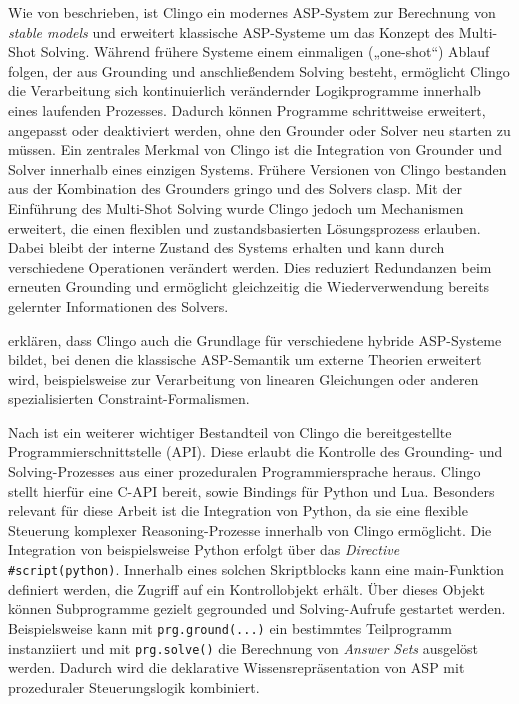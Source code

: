 Wie von \textcite{gebserMultishotASPSolving2018} beschrieben, ist Clingo ein modernes ASP-System zur Berechnung von \textit{stable models} und erweitert klassische ASP-Systeme um das Konzept des Multi-Shot Solving. Während frühere Systeme einem einmaligen („one-shot“) Ablauf folgen, der aus Grounding und anschließendem Solving besteht, ermöglicht Clingo die Verarbeitung sich kontinuierlich verändernder Logikprogramme innerhalb eines laufenden Prozesses. Dadurch können Programme schrittweise erweitert, angepasst oder deaktiviert werden, ohne den Grounder oder Solver neu starten zu müssen. Ein zentrales Merkmal von Clingo ist die Integration von Grounder und Solver innerhalb eines einzigen Systems. Frühere Versionen von Clingo bestanden aus der Kombination des Grounders gringo und des Solvers clasp. Mit der Einführung des Multi-Shot Solving wurde Clingo jedoch um Mechanismen erweitert, die einen flexiblen und zustandsbasierten Lösungsprozess erlauben. Dabei bleibt der interne Zustand des Systems erhalten und kann durch verschiedene Operationen verändert werden. Dies reduziert Redundanzen beim erneuten Grounding und ermöglicht gleichzeitig die Wiederverwendung bereits gelernter Informationen des Solvers. 

\textcite{cabalarSemanticsHybridASP2023} erklären, dass Clingo auch die Grundlage für verschiedene hybride ASP-Systeme bildet, bei denen die klassische ASP-Semantik um externe Theorien erweitert wird, beispielsweise zur Verarbeitung von linearen Gleichungen oder anderen spezialisierten Constraint-Formalismen.

Nach \textcite{gebserMultishotASPSolving2018} ist ein weiterer wichtiger Bestandteil von Clingo die bereitgestellte Programmierschnittstelle (API). Diese erlaubt die Kontrolle des Grounding- und Solving-Prozesses aus einer prozeduralen Programmiersprache heraus. Clingo stellt hierfür eine C-API bereit, sowie Bindings für Python und Lua. Besonders relevant für diese Arbeit ist die Integration von Python, da sie eine flexible Steuerung komplexer Reasoning-Prozesse innerhalb von Clingo ermöglicht. Die Integration von beispielsweise Python erfolgt über das \textit{Directive} \texttt{\#script(python)}. Innerhalb eines solchen Skriptblocks kann eine main-Funktion definiert werden, die Zugriff auf ein Kontrollobjekt erhält. Über dieses Objekt können Subprogramme gezielt gegrounded und Solving-Aufrufe gestartet werden. Beispielsweise kann mit \texttt{prg.ground(...)} ein bestimmtes Teilprogramm instanziiert und mit \texttt{prg.solve()} die Berechnung von \textit{Answer Sets} ausgelöst werden. Dadurch wird die deklarative Wissensrepräsentation von ASP mit prozeduraler Steuerungslogik kombiniert.


